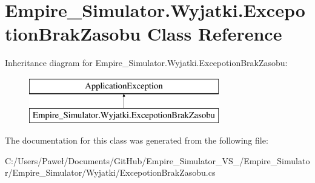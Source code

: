 \hypertarget{class_empire___simulator_1_1_wyjatki_1_1_excepotion_brak_zasobu}{\section{Empire\+\_\+\+Simulator.\+Wyjatki.\+Excepotion\+Brak\+Zasobu Class Reference}
\label{class_empire___simulator_1_1_wyjatki_1_1_excepotion_brak_zasobu}
}
Inheritance diagram for Empire\+\_\+\+Simulator.\+Wyjatki.\+Excepotion\+Brak\+Zasobu\+:\begin{figure}[H]
\begin{center}
\leavevmode
\includegraphics[height=2.000000cm]{class_empire___simulator_1_1_wyjatki_1_1_excepotion_brak_zasobu}
\end{center}
\end{figure}


The documentation for this class was generated from the following file\+:\begin{DoxyCompactItemize}
\item 
C\+:/\+Users/\+Paweł/\+Documents/\+Git\+Hub/\+Empire\+\_\+\+Simulator\+\_\+\+V\+S\+\_/\+Empire\+\_\+\+Simulator/\+Empire\+\_\+\+Simulator/\+Wyjatki/Excepotion\+Brak\+Zasobu.\+cs\end{DoxyCompactItemize}
